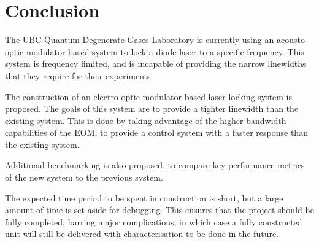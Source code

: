 \newpage
\section{Conclusion}

The UBC Quantum Degenerate Gases Laboratory is currently using an acousto-optic modulator-based system to lock a diode laser to a specific frequency.  This system is frequency limited, and is incapable of providing the narrow linewidths that they require for their experiments.

The construction of an electro-optic modulator based laser locking system is proposed.  The goals of this system are to provide a tighter linewidth than the existing system.  This is done by taking advantage of the higher bandwidth capabilities of the EOM, to provide a control system with a faster response than the existing system.

Additional benchmarking is also proposed, to compare key performance metrics of the new system to the previous system.

The expected time period to be spent in construction is short, but a large amount of time is set aside for debugging.  This ensures that the project should be fully completed, barring major complications, in which case a fully constructed unit will still be delivered with characterisation to be done in the future.
